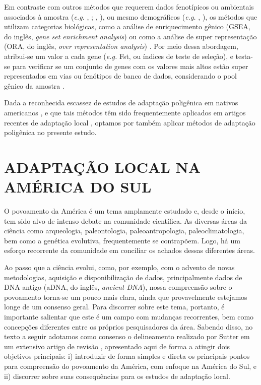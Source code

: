 Em contraste com outros métodos que requerem dados fenotípicos ou ambientais associados à amostra (\emph{e.g.} \citeauthor{hancock_human_2010}, \citeyear{hancock_human_2010}; \citeauthor{gunther_robust_2013}, \citeyear{gunther_robust_2013}), ou mesmo demográficos (\emph{e.g.} \citeauthor{racimo_detecting_2018}, \citeyear{racimo_detecting_2018}), os métodos que utilizam categorias biológicas, como a análise de enriquecimento gênico (GSEA, do inglês, \textit{gene set enrichment analysis}) \cite{subramanian_gene_2005} ou como a análise de super representação (ORA, do inglês, \textit{over representation analysis}) \cite{khatri_ten_2012}. Por meio dessa abordagem,  atribui-se um valor a cada gene (\emph{e.g.} Fst, ou índices de teste de seleção), e testa-se para verificar se um conjunto de genes com os valores mais altos estão super representados em vias ou fenótipos de banco de dados, considerando o pool gênico da amostra \cite{barghi_polygenic_2020}.

Dada a reconhecida escassez de estudos de adaptação poligênica em nativos americanos \cite{mendes_history_2020}, e que tais métodos têm sido frequentemente aplicados em artigos recentes de adaptação local \cite{bergey_polygenic_2018,harrison_natural_2019,hsieh_exome_2017,lopez_genomic_2019,reynolds_comparing_2019}, optamos por também aplicar métodos de adaptação poligênica no presente estudo.

\section{ADAPTAÇÃO LOCAL NA AMÉRICA DO SUL}

O povoamento da América é um tema amplamente estudado e, desde o início, tem sido alvo de intenso debate na comunidade científica. As diversas áreas da ciência como arqueologia, paleontologia, paleoantropologia, paleoclimatologia, bem como a genética evolutiva, frequentemente se contrapõem. Logo, há um esforço recorrente da comunidade em conciliar os achados dessas diferentes áreas. 

Ao passo que a ciência evolui, como, por exemplo, com o advento de novas metodologias, aquisição e disponibilização de dados, principalmente dados de DNA antigo (aDNA, do inglês, \textit{ancient DNA}), nossa compreensão sobre o povoamento torna-se um pouco mais clara, ainda que provavelmente estejamos longe de um consenso geral. Para discorrer sobre este tema, portanto, é importante salientar que este é um campo com mudanças recorrentes, bem como concepções diferentes entre os próprios pesquisadores da área. Sabendo disso, no texto a seguir adotamos como consenso o delineamento realizado por Sutter em um extensivo artigo de revisão \cite{sutter_pre-columbian_2020}, apresentado aqui de forma a atingir dois objetivos principais: i) introduzir de forma simples e direta os principais pontos para compreensão do povoamento da América, com enfoque na América do Sul, e  ii) discorrer sobre suas consequências para os estudos de adaptação local. 

